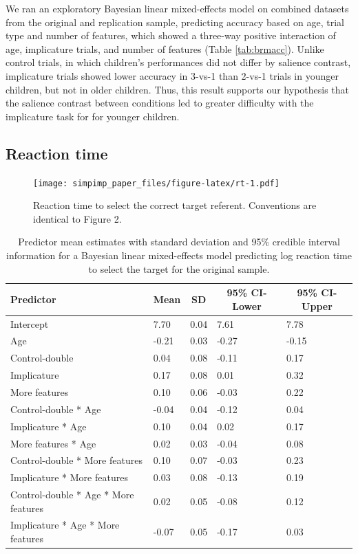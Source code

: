\documentclass[mask,man]{apa6}
\begin{document}
We ran an exploratory Bayesian linear mixed-effects model on combined
datasets from the original and replication sample, predicting accuracy
based on age, trial type and number of features, which showed a
three-way positive interaction of age, implicature trials, and number of
features (Table \ref{tab:brmacc}). Unlike control trials, in which
children's performances did not differ by salience contrast, implicature
trials showed lower accuracy in 3-vs-1 than 2-vs-1 trials in younger
children, but not in older children. Thus, this result supports our
hypothesis that the salience contrast between conditions led to greater
difficulty with the implicature task for for younger children.

\subsection{Reaction time}\label{reaction-time}

\begin{figure}
\centering
\texttt{[image: simpimp\_paper\_files/figure-latex/rt-1.pdf]}
\caption{\label{fig:rt}Reaction time to select the correct target referent.
Conventions are identical to Figure 2.}
\end{figure}

\begin{table}[tbp]
\begin{center}
\begin{threeparttable}
\caption{\label{tab:brmrtSample1}Predictor mean estimates with standard deviation and 95\% credible interval information for a Bayesian linear mixed-effects model predicting log reaction time to select the target for the original sample.}
\begin{tabular}{lllll}
\toprule
Predictor & \multicolumn{1}{c}{Mean} & \multicolumn{1}{c}{SD} & \multicolumn{1}{c}{95\% CI-Lower} & \multicolumn{1}{c}{95\% CI-Upper}\\
\midrule
Intercept & 7.70 & 0.04 & 7.61 & 7.78\\
Age & -0.21 & 0.03 & -0.27 & -0.15\\
Control-double & 0.04 & 0.08 & -0.11 & 0.17\\
Implicature & 0.17 & 0.08 & 0.01 & 0.32\\
More features & 0.10 & 0.06 & -0.03 & 0.22\\
Control-double * Age & -0.04 & 0.04 & -0.12 & 0.04\\
Implicature * Age & 0.10 & 0.04 & 0.02 & 0.17\\
More features * Age & 0.02 & 0.03 & -0.04 & 0.08\\
Control-double * More features & 0.10 & 0.07 & -0.03 & 0.23\\
Implicature * More features & 0.03 & 0.08 & -0.13 & 0.19\\
Control-double * Age * More features & 0.02 & 0.05 & -0.08 & 0.12\\
Implicature * Age * More features & -0.07 & 0.05 & -0.17 & 0.03\\
\bottomrule
\end{tabular}
\end{threeparttable}
\end{center}
\end{table}
\end{document}
